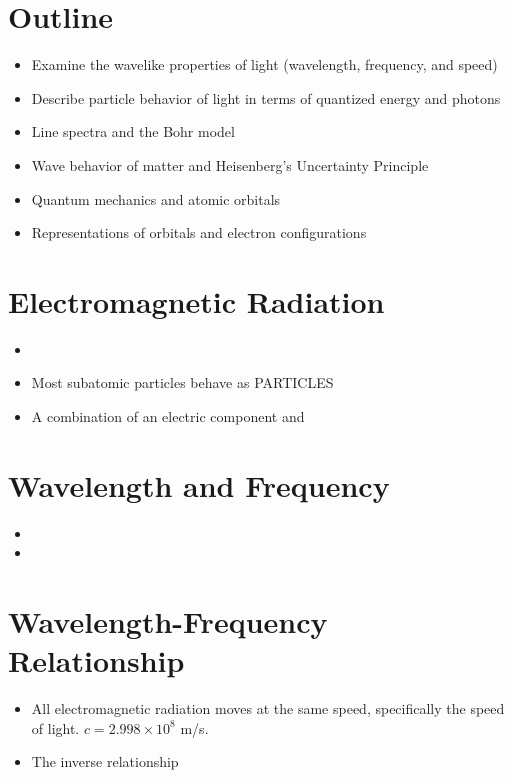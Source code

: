 \documentclass[
	chapter=7,
	title={Quantum Theory {\&} the Electronic Structure of Atoms},
	showanswers=true,
]{chem122notes}
\begin{document}
\section{Outline}\label{sec:outline-7}
\begin{itemize}
	\item Examine the wavelike properties of light (wavelength, frequency, and speed)
	\item Describe particle behavior of light in terms of quantized energy and photons
	\item Line spectra and the Bohr model
	\item Wave behavior of matter and Heisenberg's Uncertainty Principle
	\item Quantum mechanics and atomic orbitals
	\item Representations of orbitals and electron configurations
\end{itemize}

\section{Electromagnetic Radiation}\label{sec:electromagnetic-radiation}
\begin{itemize}
	\item {}
	\item Most subatomic particles behave as PARTICLES
	\item A combination of an electric component and
\end{itemize}

\section{Wavelength and Frequency}\label{sec:wavelength-and-frequency}
\begin{itemize}
	\item {}
	\item {}
\end{itemize}

\section{Wavelength-Frequency Relationship}\label{sec:wavelength-frequency-relationship}
\begin{itemize}
	\item All electromagnetic radiation moves at the same speed, specifically the speed of light. $c = 2.998 \times 10^{8}$ m/s.
	\item The inverse relationship
\end{itemize}
\end{document}
